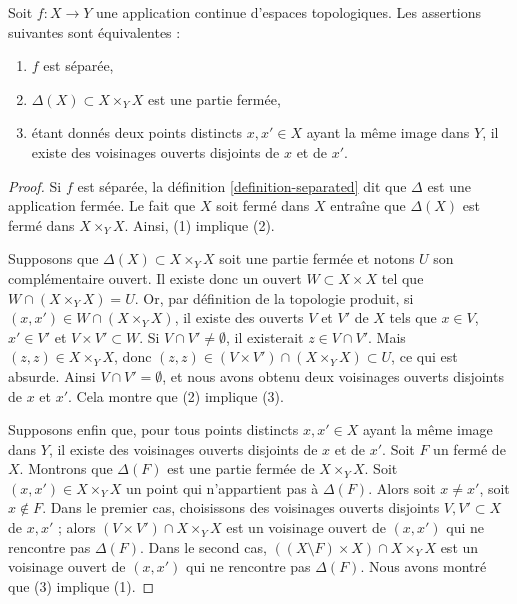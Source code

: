 \begin{lemma}
\label{lemma-separated}
Soit $f : X \to Y$ une application continue d'espaces topologiques.
Les assertions suivantes sont équivalentes :
\begin{enumerate}
\item $f$ est séparée,
\item $\Delta(X) \subset X \times_Y X$ est une partie fermée,
\item étant donnés deux points distincts $x, x' \in X$ ayant la même image
dans $Y$, il existe des voisinages ouverts disjoints de $x$ et de $x'$.
\end{enumerate}
\end{lemma}

\begin{proof}
Si $f$ est séparée, la définition \ref{definition-separated} dit que $\Delta$
est une application fermée. Le fait que $X$ soit fermé dans $X$ entraîne que
$\Delta(X)$ est fermé dans $ X\times_Y X $. Ainsi, (1) implique (2).

\medskip\noindent
Supposons que $\Delta(X) \subset X \times_Y X$ soit une partie fermée et
notons $U$ son complémentaire ouvert. Il existe donc un ouvert
$W \subset X \times X$ tel que $W \cap (X \times_Y X) = U$. Or, par
définition de la topologie produit, si
$(x, x') \in W \cap (X \times_Y X)$,
il existe des ouverts $V$ et $V'$ de $X$ tels que $x \in V$, $x' \in V'$ et
$V \times V' \subset W$. Si $V \cap V' \neq \emptyset$, il existerait
$z \in V \cap V'$. Mais $(z, z) \in X \times_Y X$, donc
$(z,z) \in (V \times V') \cap (X\times_Y X) \subset U$, ce qui est absurde.
Ainsi $V \cap V' = \emptyset $, et nous avons obtenu deux voisinages ouverts
disjoints de $x$ et $x'$. Cela montre que (2) implique (3).

\medskip\noindent
Supposons enfin que, pour tous points distincts $x, x' \in X$ ayant la même
image dans $Y$, il existe des voisinages ouverts disjoints de $x$ et de $x'$.
Soit $F$ un fermé de $X$. Montrons que $\Delta(F)$ est une partie fermée de
$X \times_Y X$. Soit $(x, x') \in X \times_Y X$ un point qui n'appartient
pas à $\Delta(F)$. Alors soit $x \not = x'$, soit $x \not \in F$.
Dans le premier cas, choisissons des voisinages ouverts disjoints
$V, V' \subset X$ de $x, x'$ ; alors $(V \times V') \cap X \times_Y X$
est un voisinage ouvert de $(x, x')$ qui ne rencontre pas $\Delta(F)$.
Dans le second cas, $((X \setminus F) \times X) \cap X \times_Y X$
est un voisinage ouvert de $(x, x')$ qui ne rencontre pas $\Delta(F)$.
Nous avons montré que (3) implique (1).
\end{proof}

